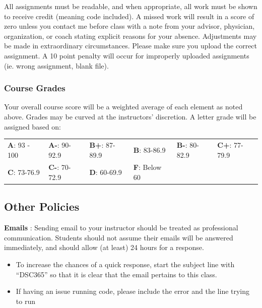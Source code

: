 \documentclass[
  11pt,
  letterpaper,
  DIV=11,
  numbers=noendperiod]{scrartcl}
\begin{document}
All assignments must be readable, and when appropriate, all work must be
shown to receive credit (meaning code included). A missed work will
result in a score of zero unless you contact me before class with a note
from your advisor, physician, organization, or coach stating explicit
reasons for your absence. Adjustments may be made in extraordinary
circumstances. Please make sure you upload the correct assignment. A 10
point penalty will occur for improperly uploaded assignments (ie. wrong
assignment, blank file).

\subsubsection{Course Grades}\label{course-grades}

Your overall course score will be a weighted average of each element as
noted above. Grades may be curved at the instructors' discretion. A
letter grade will be assigned based on:

\begin{longtable}[]{@{}
  >{\raggedright\arraybackslash}p{}
  >{\raggedright\arraybackslash}p{}
  >{\raggedright\arraybackslash}p{}
  >{\raggedright\arraybackslash}p{}
  >{\raggedright\arraybackslash}p{}
  >{\raggedright\arraybackslash}p{}@{}}
\toprule\noalign{}
\endhead
\bottomrule\noalign{}
\endlastfoot
\textbf{A}: 93 - 100 & \textbf{A-}: 90-92.9 & \textbf{B+}: 87-89.9 &
\textbf{B}: 83-86.9 & \textbf{B-}: 80-82.9 & \textbf{C+}: 77-79.9 \\
\textbf{C}: 73-76.9 & \textbf{C-}: 70-72.9 & \textbf{D}: 60-69.9 &
\textbf{F}: Below 60 & & \\
\end{longtable}

\subsection{Other Policies}\label{other-policies}

\textbf{Emails} : Sending email to your instructor should be treated as
professional communication. Students should not assume their emails will
be answered immediately, and should allow (at least) 24 hours for a
response.

\begin{itemize}
\item
  To increase the chances of a quick response, start the subject line
  with ``DSC365'' so that it is clear that the email pertains to this
  class.
\item
  If having an issue running code, please include the error and the line
  trying to run
\end{itemize}
\end{document}
